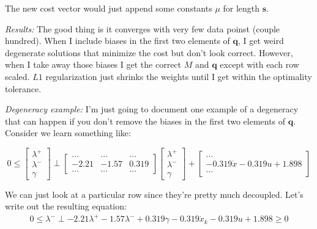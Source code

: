 \documentclass{article}
\renewcommand{\vec}[1]{\boldsymbol{#1}}
\begin{document}
The new cost vector would just append some constants $\mu$ for length $\vec{s}$.

\textit{Results: } The good thing is it converges with very few data poinst (couple hundred). When I include biases in the first two elements of $\vec{q}$, I get weird degenerate solutions that minimize the cost but don't look correct. However, when I take away those biases I get the correct $M$ and $\vec{q}$ except with each row scaled. $L1$ regularization just shrinks the weights until I get within the optimality tolerance.

\textit{Degeneracy example: } I'm just going to document one example of a degeneracy that can happen if you don't remove the biases in the first two elements of $\vec{q}$. Consider we learn something like:

\[
0 \leq
\begin{bmatrix}
    \lambda^+ \\
    \lambda^- \\
    \gamma
\end{bmatrix}
\perp
\begin{bmatrix}
    \dots & \dots & \dots \\
    -2.21 & -1.57 & 0.319 \\
    \dots & \dots & \dots
\end{bmatrix}
\begin{bmatrix}
    \lambda^+ \\
    \lambda^- \\
    \gamma
\end{bmatrix}
+ 
\begin{bmatrix}
    \dots \\
    -0.319 \dot x - 0.319 u + 1.898 \\
    \dots
\end{bmatrix}
\]

We can just look at a particular row since they're pretty much decoupled. Let's write out the resulting equation:
\begin{align*}
    0 \leq \lambda^- \perp -2.21 \lambda^+ - 1.57 \lambda^- + 0.319 \gamma - 0.319 \dot x_k - 0.319 u + 1.898 \geq 0
\end{align*}
\end{document}
